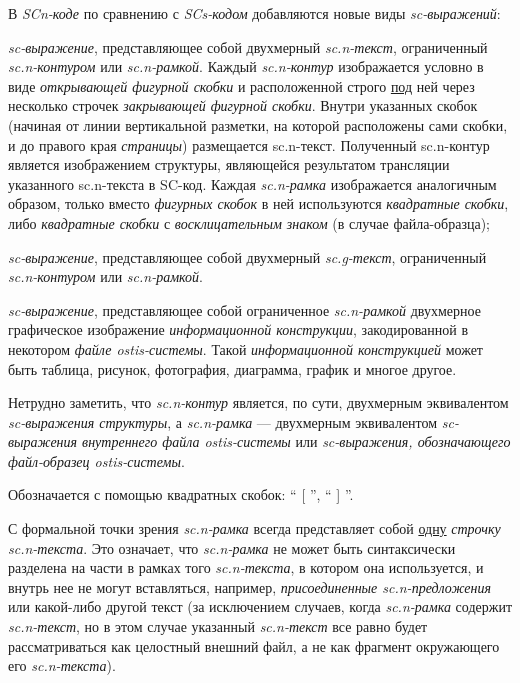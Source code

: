 В \textit{SCn-коде} по сравнению с \textit{SCs-кодом} добавляются новые виды \textit{sc-выражений}:
\begin{textitemize}
	\item \textit{sc-выражение}, представляющее собой двухмерный \textit{\mbox{sc.n-текст}}, ограниченный \textit{sc.n-контуром} или \textit{sc.n-рамкой}. Каждый \textit{sc.n-контур} изображается условно в виде \textit{открывающей фигурной скобки} и расположенной строго \uline{под} ней через несколько строчек \textit{закрывающей фигурной скобки}. Внутри указанных скобок (начиная от линии вертикальной разметки, на которой расположены сами скобки, и до правого края \textit{страницы}) размещается sc.n-текст. Полученный sc.n-контур является изображением структуры, являющейся результатом трансляции указанного sc.n-текста в SC-код. Каждая \textit{sc.n-рамка} изображается аналогичным образом, только вместо \textit{фигурных скобок} в ней используются \textit{квадратные скобки}, либо \textit{квадратные скобки} с \textit{восклицательным знаком} (в случае файла-образца);
	\item \textit{sc-выражение}, представляющее собой двухмерный \textit{sc.g-текст}, ограниченный \textit{\mbox{sc.n-контуром}} или \textit{\mbox{sc.n-рамкой}}.
	\item \textit{sc-выражение}, представляющее собой ограниченное \textit{sc.n-рамкой} двухмерное графическое изображение \textit{информационной конструкции}, закодированной в некотором \textit{файле ostis-системы}. Такой \textit{информационной конструкцией} может быть таблица, рисунок, фотография, диаграмма, график и многое другое.
\end{textitemize}

Нетрудно заметить, что \textit{sc.n-контур} является, по сути, двухмерным эквивалентом \textit{sc-выражения структуры}, а \textit{sc.n-рамка} --- двухмерным эквивалентом \textit{sc-выражения внутреннего файла \mbox{ostis-системы}} или \textit{sc-выражения, обозначающего файл-образец ostis-системы}.

\begin{SCn}
\end{SCn}

Обозначается с помощью квадратных скобок: `` [ '', `` ] ''.

С формальной точки зрения \textit{sc.n-рамка} всегда представляет собой \uline{одну} \textit{строчку sc.n-текста}. Это означает, что \textit{sc.n-рамка} не может быть синтаксически разделена на части в рамках того \textit{sc.n-текста}, в котором она используется, и внутрь нее не могут вставляться, например, \textit{присоединенные sc.n-предложения} или какой-либо другой текст (за исключением случаев, когда \textit{sc.n-рамка} содержит \textit{sc.n-текст}, но в этом случае указанный \textit{sc.n-текст} все равно будет рассматриваться как целостный внешний файл, а не как фрагмент окружающего его \textit{sc.n-текста}). 


